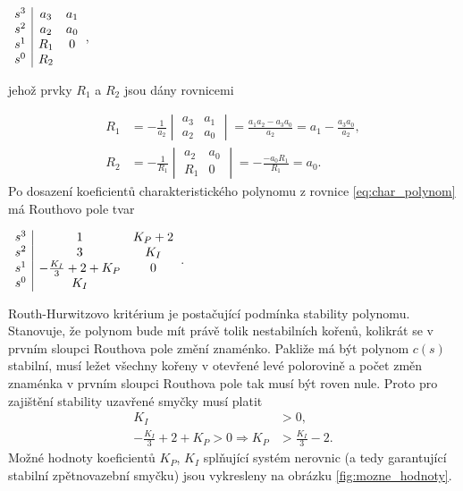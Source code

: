 \documentclass[twoside]{article}
\begin{document}
\begin{centering}
	$\begin{array}{c|cc}
		\centering
		s^3 & a_3 & a_1 \\
		s^2 & a_2 & a_0 \\
		s^1 & R_1  & 0 \\
		s^0 & R_2  &  \\
	\end{array}$, \\ 
\end{centering}

jehož prvky $R_1$ a $R_2$ jsou dány rovnicemi

\begin{equation}
	\begin{split}
		R_1 &= -\frac{1}{a_2} \begin{vmatrix*}
			a_3 & a_1 \\
			a_2 & a_0
		\end{vmatrix*} = \frac{a_1 a_2- a_3 a_0}{a_2} = a_1 -\frac{a_3 a_0}{a_2},\\
		R_2 &= - \frac{1}{R_1} \begin{vmatrix*}
			a_2 & a_0 \\
			R_1 & 0
		\end{vmatrix*} = -\frac{-a_0 R_1}{R_1} = a_0.
	\end{split}
\end{equation}
\newpage
Po dosazení koeficientů charakteristického polynomu z rovnice \eqref{eq:char_polynom} má Routhovo pole tvar 

\begin{centering}
	$\begin{array}{c|cc}
		\centering
		s^3 & 1 & K_P + 2 \\
		s^2 & 3 & K_I \\
		s^1 & -\frac{K_I}{3} + 2 + K_P & 0 \\
		s^0 & K_I &  \\
	\end{array}$. \\
\end{centering}

Routh-Hurwitzovo kritérium je postačující podmínka stability polynomu. Stanovuje, že polynom bude mít právě tolik nestabilních kořenů, kolikrát se v prvním sloupci
Routhova pole změní znaménko. Pakliže má být polynom $c(s)$ stabilní, musí ležet všechny kořeny v otevřené levé polorovině a počet změn znaménka v prvním sloupci
Routhova pole tak musí být roven nule. Proto pro zajištění stability uzavřené smyčky musí platit
\begin{equation}
	\begin{split}
		K_I &> 0, \\
		-\frac{K_I}{3} + 2 + K_P > 0 \Rightarrow K_P &> \frac{K_I}{3} - 2.
	\end{split}
\end{equation}
Možné hodnoty koeficientů $K_P$, $K_I$ splňující systém nerovnic (a tedy garantující stabilní zpětnovazební smyčku) jsou vykresleny na obrázku \ref{fig:mozne_hodnoty}.
\end{document}
